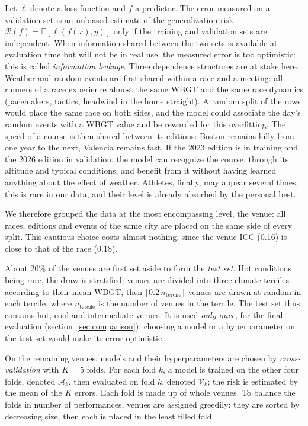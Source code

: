 \documentclass[11pt,a4paper]{article}
\newcommand{\E}{\mathbb{E}}
\begin{document}
Let $\ell$ denote a loss function and $f$ a predictor. The error measured on a validation set is an unbiased estimate
of the generalization risk $\mathcal{R}(f) = \E[\ell(f(x), y)]$ only if the training and validation sets are
independent. When information shared between the two sets is available at evaluation time but will not be in real
use, the measured error is too optimistic: this is called \emph{information leakage}. Three dependence structures are
at stake here. Weather and random events are first shared within a race and a meeting: all runners of a race
experience almost the same WBGT and the same race dynamics (pacemakers, tactics, headwind in the home straight). A
random split of the rows would place the same race on both sides, and the model could associate the day's random
events with a WBGT value and be rewarded for this overfitting. The speed of a course is then shared between its
editions: Boston remains hilly from one year to the next, Valencia remains fast. If the 2023 edition is in training
and the 2026 edition in validation, the model can recognize the course, through its altitude and typical conditions,
and benefit from it without having learned anything about the effect of weather. Athletes, finally, may appear
several times; this is rare in our data, and their level is already absorbed by the personal best.

We therefore grouped the data at the most encompassing level, the venue: all races, editions and events of the same
city are placed on the same side of every split. This cautious choice costs almost nothing, since the venue ICC (0.16)
is close to that of the race (0.18).

About 20\% of the venues are first set aside to form the \emph{test set}. Hot conditions being rare, the draw is
stratified: venues are divided into three climate terciles according to their mean WBGT, then
$\lceil 0.2\, n_{\text{tercile}} \rceil$ venues are drawn at random in each tercile, where $n_{\text{tercile}}$ is the
number of venues in the tercile. The test set thus contains hot, cool and intermediate venues. It is used \emph{only
once}, for the final evaluation (section~\ref{sec:comparison}): choosing a model or a hyperparameter on the test set
would make its error optimistic.

On the remaining venues, models and their hyperparameters are chosen by \emph{cross-validation} with $K = 5$ folds.
For each fold $k$, a model is trained on the other four folds, denoted $\mathcal{A}_k$, then evaluated on fold $k$,
denoted $\mathcal{V}_k$; the risk is estimated by the mean of the $K$ errors. Each fold is made up of whole venues. To
balance the folds in number of performances, venues are assigned greedily: they are sorted by decreasing size, then
each is placed in the least filled fold.
\end{document}
